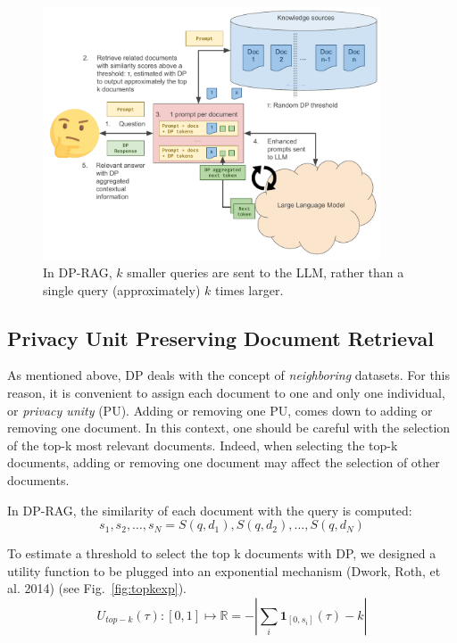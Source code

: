 \documentclass[
  12pt,
  a4paper,
]{article}
\begin{document}
\begin{figure}
\centering
\includegraphics[width=100mm,height=\textheight,keepaspectratio]{figures/DP-RAG.pdf}
\caption{In DP-RAG, \(k\) smaller queries are sent to the LLM, rather
than a single query (approximately) \(k\) times
larger.}\label{fig:dprag}
\end{figure}

\subsection{Privacy Unit Preserving Document
Retrieval}\label{privacy-unit-preserving-document-retrieval}

As mentioned above, DP deals with the concept of \emph{neighboring}
datasets. For this reason, it is convenient to assign each document to
one and only one individual, or \emph{privacy unity} (PU). Adding or
removing one PU, comes down to adding or removing one document. In this
context, one should be careful with the selection of the top-k most
relevant documents. Indeed, when selecting the top-k documents, adding
or removing one document may affect the selection of other documents.

In DP-RAG, the similarity of each document with the query is computed:
\[s_1, s_2,\ldots, s_N = S(q, d_1), S(q, d_2), \ldots, S(q, d_N)\]

To estimate a threshold to select the top k documents with DP, we
designed a utility function to be plugged into an exponential mechanism
(Dwork, Roth, et al. 2014) (see Fig.~\ref{fig:topkexp}).
\[U_{top-k}(\tau): [0, 1] \mapsto \mathbb{R} = -\left|\sum_i\mathbf{1}_{[0, s_i]}(\tau)-k\right|\]
\end{document}
